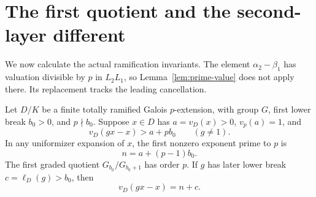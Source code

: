 \section{The first quotient and the second-layer different}\label{sec:ramification}

We now calculate the actual ramification invariants. The
element \(\alpha_2-\beta_1\) has valuation divisible by \(p\)
in \(L_2L_1\), so Lemma~\ref{lem:prime-value} does not apply
there. Its replacement tracks the leading cancellation.

\begin{lemma}\label{lem:cancellation}
Let \(D/K\) be a finite totally ramified Galois \(p\)-extension,
with group \(G\), first lower break \(b_0>0\), and \(p\nmid b_0\).
Suppose \(x\in D\) has \(a=v_D(x)>0\), \(v_p(a)=1\), and
\begin{equation}\label{eq:cancellation-hyp}
 v_D(gx-x)>a+p b_0\qquad(g\ne1).
\end{equation}
In any uniformizer expansion of \(x\), the first nonzero
exponent prime to \(p\) is
\[
 n=a+(p-1)b_0.
\]
The first graded quotient \(G_{b_0}/G_{b_0+1}\) has order \(p\).
If \(g\) has later lower break \(c=\ell_D(g)>b_0\), then
\begin{equation}\label{eq:later-rule}
 v_D(gx-x)=n+c.
\end{equation}
\end{lemma}

